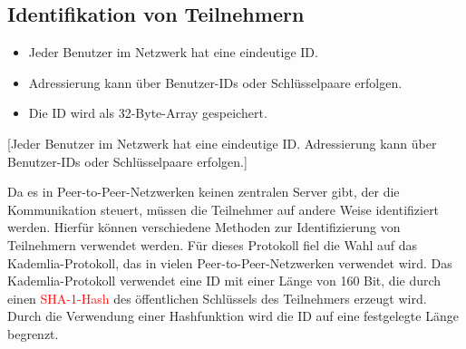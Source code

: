 \subsection{Identifikation von Teilnehmern}
\label{subsec:identifikation_von_teilnehmern}


\begin{itemize}
    \item Jeder Benutzer im Netzwerk hat eine eindeutige ID.
    \item Adressierung kann über Benutzer-IDs oder Schlüsselpaare erfolgen.
    \item Die ID wird als 32-Byte-Array gespeichert.
\end{itemize}

[Jeder Benutzer im Netzwerk hat eine eindeutige ID. Adressierung kann über 
Benutzer-IDs oder Schlüsselpaare erfolgen.]

\noindent Da es in Peer-to-Peer-Netzwerken keinen zentralen Server gibt, der die
Kommunikation steuert, müssen die Teilnehmer auf andere Weise identifiziert
werden. Hierfür können verschiedene Methoden zur
Identifizierung von Teilnehmern verwendet werden. Für dieses Protokoll
fiel die Wahl auf das Kademlia-Protokoll, das in vielen Peer-to-Peer-Netzwerken
verwendet wird. Das Kademlia-Protokoll verwendet eine ID mit einer Länge von 160
Bit, die durch einen \textcolor{red}{SHA-1-Hash} des öffentlichen Schlüssels des 
Teilnehmers erzeugt wird. Durch die Verwendung einer Hashfunktion wird die ID auf eine
festgelegte Länge begrenzt.

